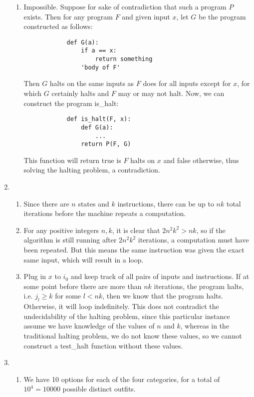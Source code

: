 \begin{enumerate}
\begin{enumerate}
        \item Impossible. Suppose for sake of contradiction that such a program $P$ exists. Then for any program $F$ and given input $x$, let $G$ be the program constructed as follows:
        \begin{verbatim}
            def G(a):
                if a == x:
                    return something
                'body of F'
        \end{verbatim}
        Then $G$ halts on the same inputs as $F$ does for all inputs except for $x$, for which $G$ certainly halts and $F$ may or may not halt. Now, we can construct the program is\_halt:
        \begin{verbatim}
            def is_halt(F, x):
                def G(a):
                    ...
                return P(F, G)
        \end{verbatim}
        This function will return true is $F$ halts on $x$ and false otherwise, thus solving the halting problem, a contradiction.
    \end{enumerate}
    
    \item \begin{enumerate}
        \item Since there are $n$ states and $k$ instructions, there can be up to $nk$ total iterations before the machine repeats a computation.
        
        \item For any positive integers $n, k$, it is clear that $2n^2k^2 > nk$, so if the algorithm is still running after $2n^2k^2$ iterations, a computation must have been repeated. But this means the same instruction was given the exact same input, which will result in a loop.
        
        \item Plug in $x$ to $i_0$ and keep track of all pairs of inputs and instructions. If at some point before there are more than $nk$ iterations, the program halts, i.e. $j_l \geq k$ for some $l < nk$, then we know that the program halts. Otherwise, it will loop indefinitely. This does not contradict the undecidability of the halting problem, since this particular instance assume we have knowledge of the values of $n$ and $k$, whereas in the traditional halting problem, we do not know these values, so we cannot construct a test\_halt function without these values.
    \end{enumerate}
    
    \item \begin{enumerate}
        \item We have 10 options for each of the four categories, for a total of $10^4 = 10000$ possible distinct outfits.
        

\end{enumerate}
\end{enumerate}
